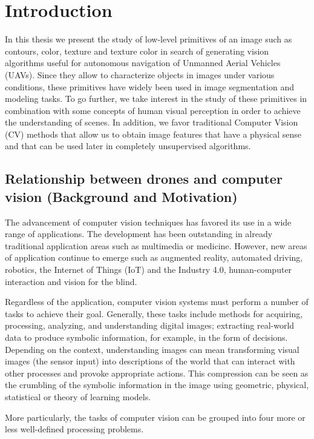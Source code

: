 \chapter*{Introduction}
In this thesis we present the study of low-level primitives of an image such as contours, color, texture and texture color in search of generating vision algorithms useful for autonomous navigation of Unmanned Aerial Vehicles (UAVs). Since they allow to characterize objects in images under various conditions, these primitives have widely been used in image segmentation and modeling tasks. To go further, we take interest in the study of these primitives in combination with some concepts of human visual perception in order to achieve the understanding of scenes. In addition, we favor traditional Computer Vision (CV) methods that allow us to obtain image features that have a physical sense and that can be used later in completely unsupervised algorithms.

\section*{Relationship between drones and computer vision (Background and Motivation)}

The advancement of computer vision techniques has favored its use in a wide range of applications. The development has been outstanding in already traditional application areas such as multimedia or medicine. However, new areas of application continue to emerge such as augmented reality, automated driving, robotics, the Internet of Things (IoT) and the Industry 4.0, human-computer interaction and vision for the blind. 

Regardless of the application, computer vision systems must perform a number of tasks to achieve their goal. Generally, these tasks include methods for acquiring, processing, analyzing, and understanding digital images; extracting real-world data to produce symbolic information, for example, in the form of decisions. Depending on the context, understanding images can mean transforming visual images (the sensor input) into descriptions of the world that can interact with other processes and provoke appropriate actions. This compression can be seen as the crumbling of the symbolic information in the image using geometric, physical, statistical or theory of learning models.

More particularly, the tasks of computer vision can be grouped into four more or less well-defined processing problems.

